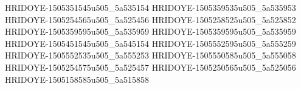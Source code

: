 HRIDOYE-1505351545u505_5a535154
HRIDOYE-1505359535u505_5a535953
HRIDOYE-1505254565u505_5a525456
HRIDOYE-1505258525u505_5a525852
HRIDOYE-1505359595u505_5a535959
HRIDOYE-1505359595u505_5a535959
HRIDOYE-1505451545u505_5a545154
HRIDOYE-1505552595u505_5a555259
HRIDOYE-1505552535u505_5a555253
HRIDOYE-1505550585u505_5a555058
HRIDOYE-1505254575u505_5a525457
HRIDOYE-1505250565u505_5a525056
HRIDOYE-1505158585u505_5a515858
